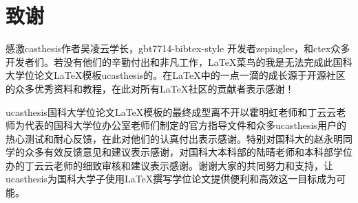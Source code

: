 %
%
%
%
%
%
%
%
%
%
%
%

\chapter[致谢]{致\quad 谢}%
\pagestyle{mainmatterstyle} %

感激casthesis作者吴凌云学长，gbt7714-bibtex-style
开发者zepinglee，和ctex众多开发者们。若没有他们的辛勤付出和非凡工作，\LaTeX{}菜鸟的我是无法完成此国科大学位论文\LaTeX{}模板ucasthesis的。在\LaTeX{}中的一点一滴的成长源于开源社区的众多优秀资料和教程，在此对所有\LaTeX{}社区的贡献者表示感谢！

ucasthesis国科大学位论文\LaTeX{}模板的最终成型离不开以霍明虹老师和丁云云老师为代表的国科大学位办公室老师们制定的官方指导文件和众多ucasthesis用户的热心测试和耐心反馈，在此对他们的认真付出表示感谢。特别对国科大的赵永明同学的众多有效反馈意见和建议表示感谢，对国科大本科部的陆晴老师和本科部学位办的丁云云老师的细致审核和建议表示感谢。谢谢大家的共同努力和支持，让ucasthesis为国科大学子使用\LaTeX{}撰写学位论文提供便利和高效这一目标成为可能。

\cleardoublepage[plain]%

